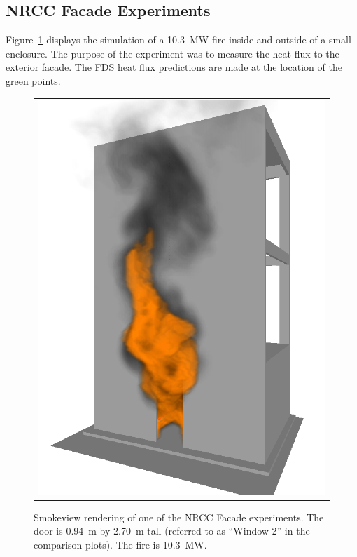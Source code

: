 \clearpage

\subsection{NRCC Facade Experiments}

Figure~\ref{NRCC_Facade_Image} displays the simulation of a 10.3~MW fire inside and outside of a small enclosure. The purpose of the experiment was to measure the heat flux to the exterior facade. The FDS heat flux predictions are made at the location of the green points.

\begin{figure}[h!]
\begin{center}
\begin{tabular}{c}
\includegraphics[width=5.0in]{FIGURES/NRCC_Facade/NRCC_Facade_Win_2_10_MW_0467}
\end{tabular}
\end{center}
\caption[Smokeview rendering of NRCC Facade experiment]
{Smokeview rendering of one of the NRCC Facade experiments. The door is
0.94~m by 2.70~m tall (referred to as ``Window 2'' in the comparison plots). The
fire is 10.3~MW.}
\label{NRCC_Facade_Image}
\end{figure}


